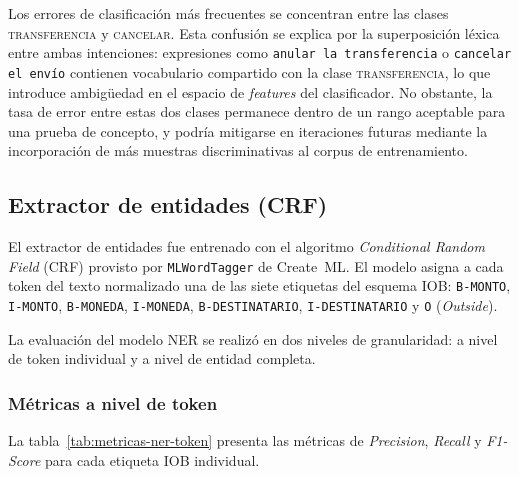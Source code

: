 Los errores de clasificación más frecuentes se concentran entre las clases \textsc{transferencia} y \textsc{cancelar}. Esta confusión se explica por la
superposición léxica entre ambas intenciones: expresiones como \texttt{anular la transferencia} o \texttt{cancelar el envío} contienen vocabulario compartido con la
clase \textsc{transferencia}, lo que introduce ambigüedad en el espacio de \textit{features} del clasificador. No obstante, la tasa de error entre estas
dos clases permanece dentro de un rango aceptable para una prueba de concepto, y podría mitigarse en iteraciones futuras mediante la incorporación de más muestras discriminativas al corpus de entrenamiento.

\subsection{Extractor de entidades (CRF)}
\label{subsec:desempeno-ner}

El extractor de entidades fue entrenado con el algoritmo
\textit{Conditional Random Field} (CRF) provisto por \texttt{MLWordTagger} de
Create~ML. El modelo asigna a cada token del texto normalizado una de las siete
etiquetas del esquema IOB: \texttt{B-MONTO}, \texttt{I-MONTO},
\texttt{B-MONEDA}, \texttt{I-MONEDA}, \texttt{B-DESTINATARIO},
\texttt{I-DESTINATARIO} y \texttt{O} (\textit{Outside}).

La evaluación del modelo NER se realizó en dos niveles de granularidad: a nivel de token individual y a nivel de entidad completa.

\subsubsection{Métricas a nivel de token}

La tabla~\ref{tab:metricas-ner-token} presenta las métricas de \textit{Precision}, \textit{Recall} y \textit{F1-Score} para cada etiqueta IOB
individual.


